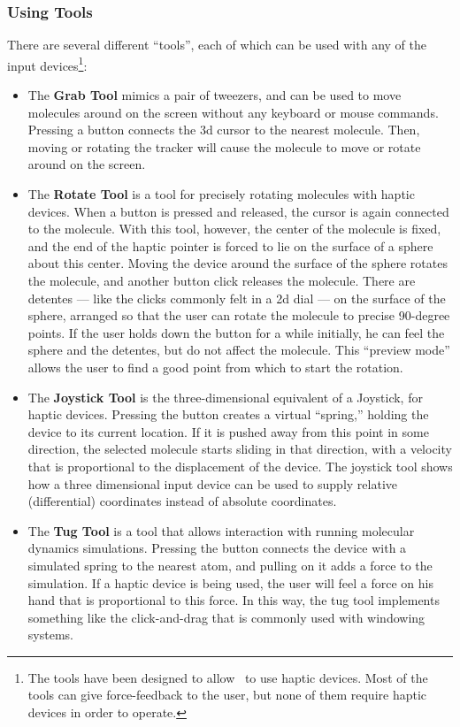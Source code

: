\subsubsection{Using Tools}
\label{ug:tools}
There are several different ``tools'',
each of which can be used with any of the input
devices\footnote{The tools have been designed to allow \VMD\ to
use haptic devices.  Most of the tools can give force-feedback
to the user, but none of them require haptic devices in order to operate.}:
\begin{itemize}
\item The {\bf Grab Tool} mimics a pair of tweezers, and can be
used to move molecules around on the screen without any keyboard or
mouse commands.  Pressing a button connects the 3d cursor to the
nearest molecule.  Then, moving or rotating the tracker will cause the
molecule to move or rotate around on the screen.

\item The {\bf Rotate Tool} is a tool for precisely rotating
molecules with haptic devices.  When a button is pressed and released,
the cursor is again connected to the molecule.  With this tool,
however, the center of the molecule is fixed, and the end of the
haptic pointer is forced to lie on the surface of a sphere about this
center.  Moving the device around the surface of the sphere rotates
the molecule, and another button click releases the molecule.  There
are detentes --- like the clicks commonly felt in a 2d dial --- on the
surface of the sphere, arranged so that the user can rotate the molecule to
precise 90-degree points.  If the user holds down the button for a
while initially, he can feel the sphere and the detentes, but do not
affect the molecule.  This ``preview mode'' allows the user to find a
good point from which to start the rotation.

\item The {\bf Joystick Tool} is the three-dimensional equivalent of a
Joystick, for haptic devices.  Pressing the button creates a virtual
``spring,'' holding the device to its current location.  If it is
pushed away from this point in some direction, the selected molecule
starts sliding in that direction, with a velocity that is proportional
to the displacement of the device.  The joystick tool shows how a
three dimensional input device can be used to supply relative
(differential) coordinates instead of absolute coordinates.  

\item The {\bf Tug Tool} is a tool that allows interaction with
running molecular dynamics simulations.  Pressing the button connects
the device with a simulated spring to the nearest atom, and pulling on
it adds a force to the simulation.  If a haptic device is being used,
the user will feel a force on his hand that is proportional to this
force.  In this way, the tug tool implements something like the
click-and-drag that is commonly used with windowing systems.


\end{itemize}
